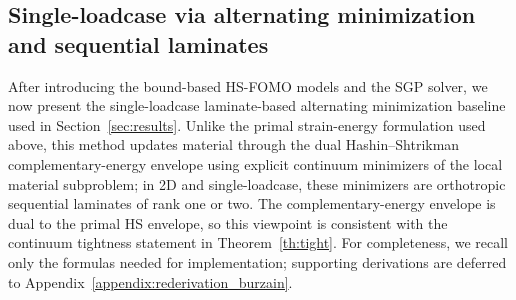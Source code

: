 \documentclass[preprint,3p]{elsarticle}
\begin{document}

\subsection{Single-loadcase via alternating minimization and sequential laminates}\label{sec:allaire_alg}

After introducing the bound-based HS-FOMO models and the SGP solver, we now present the single-loadcase laminate-based alternating minimization baseline used in Section~\ref{sec:results}. Unlike the primal strain-energy formulation used above, this method updates material through the dual Hashin--Shtrikman complementary-energy envelope using explicit continuum minimizers of the local material subproblem; in 2D and single-loadcase, these minimizers are orthotropic sequential laminates of rank one or two. The complementary-energy envelope is dual to the primal HS envelope, so this viewpoint is consistent with the continuum tightness statement in Theorem~\ref{th:tight}. For completeness, we recall only the formulas needed for implementation; supporting derivations are deferred to Appendix~\ref{appendix:rederivation_burzain}.
\end{document}
